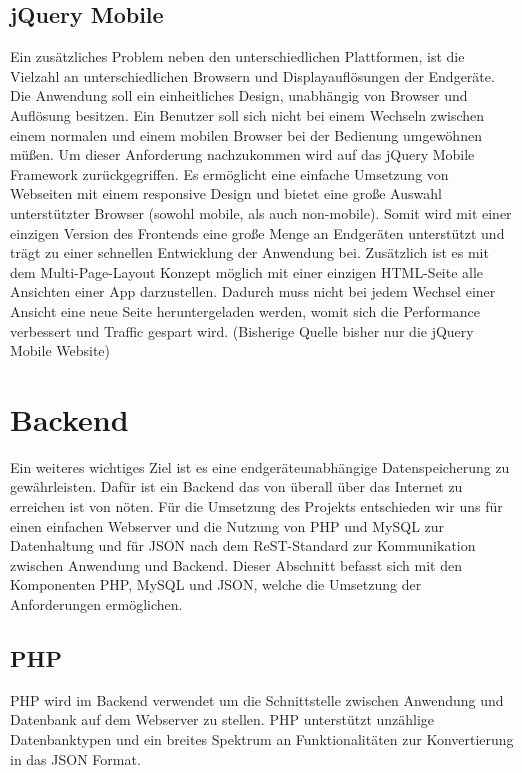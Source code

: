 \documentclass[10pt, conference, compsocconf]{IEEEtran}
\begin{document}
\subsection{jQuery Mobile}
Ein zus\"atzliches Problem neben den unterschiedlichen Plattformen, ist die Vielzahl an unterschiedlichen Browsern und Displayaufl\"osungen der Endger\"ate. 
Die Anwendung soll ein einheitliches Design, unabh\"angig von Browser und Aufl\"osung besitzen. 
Ein Benutzer soll sich nicht bei einem Wechseln zwischen einem normalen und einem mobilen Browser bei der Bedienung umgew\"ohnen m\"u{\ss}en. 
Um dieser Anforderung nachzukommen wird auf das jQuery Mobile Framework zur\"uckgegriffen.
Es erm\"oglicht eine einfache Umsetzung von Webseiten mit einem responsive Design und bietet eine gro{\ss}e Auswahl unterst\"utzter Browser (sowohl mobile, als auch non-mobile). 
Somit wird mit einer einzigen Version des Frontends eine gro{\ss}e Menge an Endger\"aten unterst\"utzt und tr\"agt zu einer schnellen Entwicklung der Anwendung bei. 
Zus\"atzlich ist es mit dem Multi-Page-Layout Konzept m\"oglich mit einer einzigen HTML-Seite alle Ansichten einer App darzustellen. Dadurch muss nicht bei jedem Wechsel einer Ansicht eine neue Seite heruntergeladen werden, womit sich die Performance verbessert und Traffic gespart wird. (Bisherige Quelle bisher nur die jQuery Mobile Website)

\section{Backend}
Ein weiteres wichtiges Ziel ist es eine endger\"ateunabh\"angige Datenspeicherung zu gew\"ahrleisten. 
Daf\"ur ist ein Backend das von \"uberall \"uber das Internet zu erreichen ist von n\"oten. 
F\"ur die Umsetzung des Projekts entschieden wir uns f\"ur einen einfachen Webserver und die Nutzung von PHP und MySQL zur Datenhaltung und f\"ur JSON nach dem ReST-Standard zur Kommunikation zwischen Anwendung und Backend.  
Dieser Abschnitt befasst sich mit den Komponenten PHP, MySQL und JSON, welche die Umsetzung der Anforderungen erm\"oglichen.

\subsection{PHP}
PHP wird im Backend verwendet um die Schnittstelle zwischen Anwendung und Datenbank auf dem Webserver zu stellen. PHP unterst\"utzt unz\"ahlige Datenbanktypen und ein breites Spektrum an Funktionalit\"aten zur Konvertierung in das JSON Format.
\end{document}
